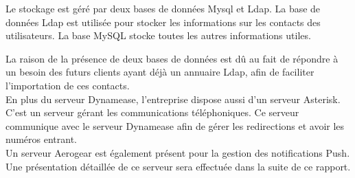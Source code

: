 Le stockage est géré par deux bases de données Mysql et Ldap. La base de données Ldap est utilisée pour stocker les informations sur les contacts des utilisateurs. La base MySQL stocke toutes les autres informations utiles.

La raison de la présence de deux bases de données est dû au fait de répondre à un besoin des futurs clients ayant déjà un annuaire Ldap, afin de faciliter l'importation de ces contacts.\\

En plus du serveur Dynamease, l'entreprise dispose aussi d'un serveur Asterisk. C'est un serveur gérant les communications téléphoniques. Ce serveur communique avec le serveur Dynamease afin de gérer les redirections et avoir les numéros entrant.\\

Un serveur Aerogear est également présent pour la gestion des notifications Push. Une présentation détaillée de ce serveur sera effectuée dans la suite de ce rapport.